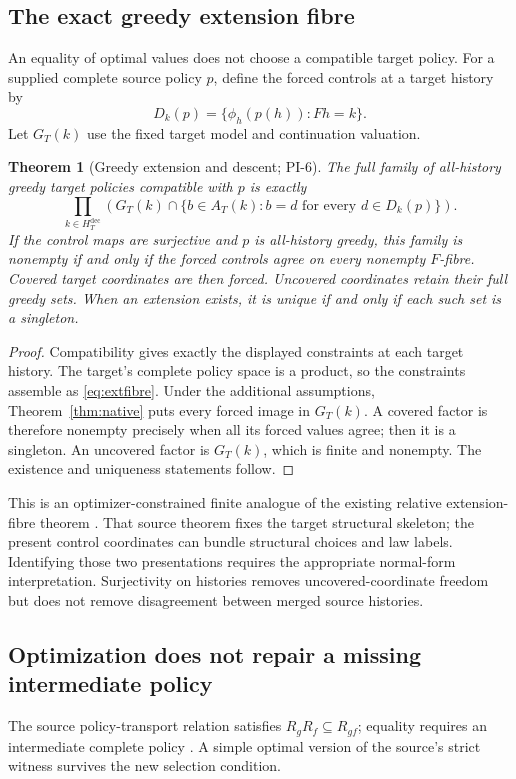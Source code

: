 \documentclass[11pt]{article}
\newtheorem{theorem}{Theorem}[section]
\theoremstyle{definition}
\begin{document}
\subsection{The exact greedy extension fibre}
\label{sec:fibre}
An equality of optimal values does not choose a compatible target policy.
For a supplied complete source policy \(p\), define the forced controls at
a target history by
\[
 D_k(p)=\{\phi_h(p(h)):Fh=k\}.
\]
Let \(G_T(k)\) use the fixed target model and continuation valuation.

\begin{theorem}[Greedy extension and descent; PI-6]
\label{thm:fibre}
The full family of all-history greedy target policies compatible with \(p\)
is exactly
\begin{equation}
 \prod_{k\in H_T^{\mathrm{dec}}}
 \left(
 G_T(k)\cap
 \{b\in A_T(k): b=d\text{ for every }d\in D_k(p)\}
 \right).
 \label{eq:extfibre}
\end{equation}
If the control maps are surjective and \(p\) is all-history greedy, this
family is nonempty if and only if the forced controls agree on every
nonempty \(F\)-fibre. Covered target coordinates are then forced.
Uncovered coordinates retain their full greedy sets. When an extension
exists, it is unique if and only if each such set is a singleton.
\end{theorem}
\begin{proof}
Compatibility gives exactly the displayed constraints at each target
history. The target's complete policy space is a product, so the constraints
assemble as \eqref{eq:extfibre}. Under the additional assumptions,
Theorem~\ref{thm:native} puts every forced image in \(G_T(k)\). A covered
factor is therefore nonempty precisely when all its forced values agree;
then it is a singleton. An uncovered factor is \(G_T(k)\), which is finite
and nonempty. The existence and uniqueness statements follow.
\end{proof}

This is an optimizer-constrained finite analogue of the existing relative
extension-fibre theorem \cite{conditional}. That source theorem fixes the
target structural skeleton; the present control coordinates can bundle
structural choices and law labels. Identifying those two presentations
requires the appropriate normal-form interpretation.
Surjectivity on histories removes uncovered-coordinate freedom but
does not remove disagreement between merged source histories.

\subsection{Optimization does not repair a missing intermediate policy}
\label{sec:middle}
The source policy-transport relation satisfies
\(R_gR_f\subseteq R_{gf}\); equality requires an intermediate complete
policy \cite{transport}. A simple optimal version of the source's strict
witness survives the new selection condition.
\end{document}
